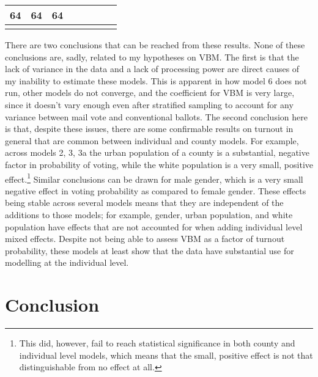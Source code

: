 \documentclass[12pt,twoside]{reedthesis}
\begin{document}
\begin{longtable}[]{@{}lccccccc@{}}
\begin{minipage}[t]{0.10\columnwidth}
  64\strut
  \end{minipage} & \begin{minipage}[t]{0.10\columnwidth}\centering\strut
  64\strut
  \end{minipage} & \begin{minipage}[t]{0.10\columnwidth}\centering\strut
  64\strut
  \end{minipage}\tabularnewline
  \bottomrule
  \addlinespace
  \multicolumn{5}{c}{** $ p<0.01 $; * $ p<0.05 $} \\
  \end{longtable}
  
  There are two conclusions that can be reached from these results. None
  of these conclusions are, sadly, related to my hypotheses on VBM. The
  first is that the lack of variance in the data and a lack of processing
  power are direct causes of my inability to estimate these models. This
  is apparent in how model 6 does not run, other models do not converge,
  and the coefficient for VBM is very large, since it doesn't vary enough
  even after stratified sampling to account for any variance between mail
  vote and conventional ballots. The second conclusion here is that,
  despite these issues, there are some confirmable results on turnout in
  general that are common between individual and county models. For
  example, across models 2, 3, 3a the urban population of a county is a
  substantial, negative factor in probability of voting, while the white
  population is a very small, positive effect.\footnote{This did, however,
    fail to reach statistical significance in both county and individual
    level models, which means that the small, positive effect is not that
    distinguishable from no effect at all.} Similar conclusions can be
  drawn for male gender, which is a very small negative effect in voting
  probability as compared to female gender. These effects being stable
  across several models means that they are independent of the additions
  to those models; for example, gender, urban population, and white
  population have effects that are not accounted for when adding
  individual level mixed effects. Despite not being able to assess VBM as
  a factor of turnout probability, these models at least show that the
  data have substantial use for modelling at the individual level.
  
  \chapter*{Conclusion}\label{conclusion}
  
\end{document}
